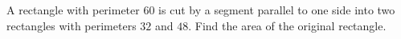 A rectangle with perimeter $60$ is cut by a segment parallel to one side into two rectangles with perimeters $32$ and $48$. Find the area of the original rectangle.
